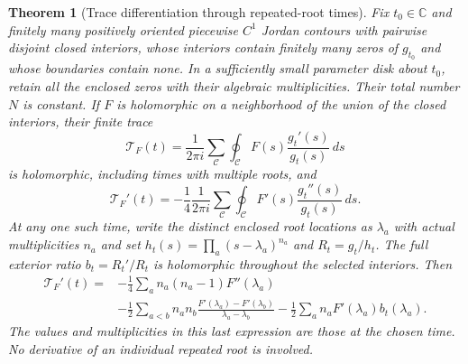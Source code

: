 \documentclass[11pt]{article}
\newcommand{\C}{\mathbb C}\newcommand{\R}{\mathbb R}
\newtheorem{theorem}{Theorem}[section]
\begin{document}
\begin{theorem}[Trace differentiation through repeated-root times]
\label{thm:collision-trace}
Fix $t_0\in\C$ and finitely many positively oriented piecewise
$C^1$ Jordan contours with pairwise disjoint closed interiors,
whose interiors contain finitely many zeros of $g_{t_0}$ and
whose boundaries contain none. In a sufficiently
small parameter disk about $t_0$, retain all the enclosed zeros
with their algebraic multiplicities. Their total number $N$ is
constant. If $F$ is holomorphic on a neighborhood of the union
of the closed interiors, their finite trace
\begin{equation}\label{eq:contour-trace}
\mathscr T_F(t)=\frac1{2\pi i}\sum_{\mathcal C}
\oint_{\mathcal C}F(s)\frac{g_t'(s)}{g_t(s)}\,ds
\end{equation}
is holomorphic, including times with multiple roots, and
\begin{equation}\label{eq:contour-trace-derivative}
\mathscr T_F'(t)=-\frac14\frac1{2\pi i}
\sum_{\mathcal C}\oint_{\mathcal C}
F'(s)\frac{g_t''(s)}{g_t(s)}\,ds.
\end{equation}
At any one such time, write the distinct enclosed root locations
as $\lambda_a$ with actual multiplicities $n_a$ and set
$h_t(s)=\prod_a(s-\lambda_a)^{n_a}$ and $R_t=g_t/h_t$.
The full exterior ratio $b_t=R_t'/R_t$ is holomorphic throughout
the selected interiors. Then
\begin{equation}\label{eq:multiple-trace}
\begin{split}
\mathscr T_F'(t)={}&-\frac14\sum_a n_a(n_a-1)F''(\lambda_a)\\
&-\frac12\sum_{a<b}n_an_b
\frac{F'(\lambda_a)-F'(\lambda_b)}{\lambda_a-\lambda_b}
-\frac12\sum_a n_aF'(\lambda_a)b_t(\lambda_a).
\end{split}
\end{equation}
The values and multiplicities in this last expression are those
at the chosen time. No derivative of an individual repeated root
is involved.
\end{theorem}
\end{document}
